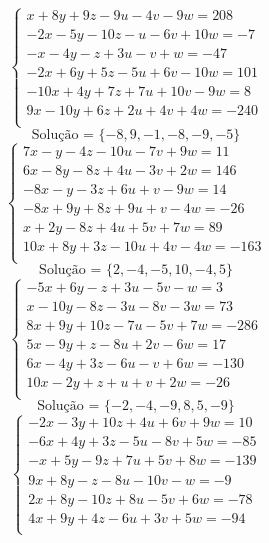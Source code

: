 \documentclass[12pt,oneside,a4paper]{article}
\begin{document}
\vspace{\baselineskip}
\begin{equation*}
\begin{cases}
x+8y+9z-9u-4v-9w=208 \\
-2x-5y-10z-u-6v+10w=-7 \\
-x-4y-z+3u-v+w=-47 \\
-2x+6y+5z-5u+6v-10w=101 \\
-10x+4y+7z+7u+10v-9w=8 \\
9x-10y+6z+2u+4v+4w=-240 \\
\end{cases}
\end{equation*}
\begin{equation*}
\text{Solução = }\{-8,9,-1,-8,-9,-5\}
\end{equation*}
\vspace{\baselineskip}
\begin{equation*}
\begin{cases}
7x-y-4z-10u-7v+9w=11 \\
6x-8y-8z+4u-3v+2w=146 \\
-8x-y-3z+6u+v-9w=14 \\
-8x+9y+8z+9u+v-4w=-26 \\
x+2y-8z+4u+5v+7w=89 \\
10x+8y+3z-10u+4v-4w=-163 \\
\end{cases}
\end{equation*}
\begin{equation*}
\text{Solução = }\{2,-4,-5,10,-4,5\}
\end{equation*}
\vspace{\baselineskip}
\begin{equation*}
\begin{cases}
-5x+6y-z+3u-5v-w=3 \\
x-10y-8z-3u-8v-3w=73 \\
8x+9y+10z-7u-5v+7w=-286 \\
5x-9y+z-8u+2v-6w=17 \\
6x-4y+3z-6u-v+6w=-130 \\
10x-2y+z+u+v+2w=-26 \\
\end{cases}
\end{equation*}
\begin{equation*}
\text{Solução = }\{-2,-4,-9,8,5,-9\}
\end{equation*}
\vspace{\baselineskip}
\begin{equation*}
\begin{cases}
-2x-3y+10z+4u+6v+9w=10 \\
-6x+4y+3z-5u-8v+5w=-85 \\
-x+5y-9z+7u+5v+8w=-139 \\
9x+8y-z-8u-10v-w=-9 \\
2x+8y-10z+8u-5v+6w=-78 \\
4x+9y+4z-6u+3v+5w=-94 \\
\end{cases}
\end{equation*}
\end{document}

